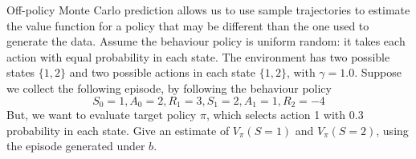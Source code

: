 Off-policy Monte Carlo prediction allows us to use sample trajectories to 
estimate the value function for a policy that may be different than the one
used to generate the data. Assume the behaviour policy is uniform random: it takes each action with equal probability in each state. The environment has two possible states $\{1,2\}$ and two possible actions in each state $\{1, 2\}$, with $\gamma = 1.0$. Suppose we collect the following episode, by following the behaviour policy
%
\begin{equation*}
	S_0 = 1, A_0 = 2, R_1 = 3, S_1 = 2, A_1 = 1, R_2 = -4
\end{equation*}
%
But, we want to evaluate target policy $\pi$, which selects action 1 with 0.3 probability in each state.
Give an estimate of $V_\pi(S=1)$ and $V_\pi(S=2)$, using the episode generated under $b$.




